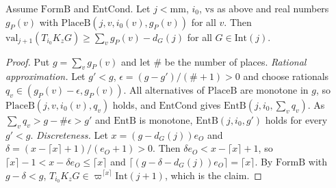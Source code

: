 \begin{lemma}\label{pf:top-shape:formplace}
Assume $\mathrm{FormB}$ and $\mathrm{EntCond}$. Let $j<\mathrm{mm}$, $i_0$, $\mathrm{vs}$ as above and real numbers $g_P(v)$ with
$\mathrm{PlaceB}(j,v,i_0(v),g_P(v))$ for all $v$. Then $\mathrm{val}_{j+1}(T_{i_0}K_zG)\ge\sum_vg_P(v)-d_G(j)$ for all $G\in\mathrm{Int}(j)$.
\end{lemma}

\begin{proof}
Put $g=\sum_vg_P(v)$ and let $\#$ be the number of places. \emph{Rational approximation.} Let $g'<g$,
$\epsilon=(g-g')/(\#+1)>0$ and choose rationals $q_v\in(g_P(v)-\epsilon,g_P(v))$. All alternatives of $\mathrm{PlaceB}$ are
monotone in $g$, so $\mathrm{PlaceB}(j,v,i_0(v),q_v)$ holds, and $\mathrm{EntCond}$ gives $\mathrm{EntB}(j,i_0,\sum_vq_v)$. As
$\sum_vq_v>g-\#\epsilon>g'$ and $\mathrm{EntB}$ is monotone, $\mathrm{EntB}(j,i_0,g')$ holds for every $g'<g$.
\emph{Discreteness.} Let $x=(g-d_G(j))e_O$ and $\delta=(x-\lceil x\rceil+1)/(e_O+1)>0$. Then $\delta e_O<x-\lceil x\rceil+1$, so
$\lceil x\rceil-1<x-\delta e_O\le\lceil x\rceil$ and $\lceil(g-\delta-d_G(j))e_O\rceil=\lceil x\rceil$. By $\mathrm{FormB}$ with
$g-\delta<g$, $T_{i_0}K_zG\in\varpi^{\lceil x\rceil}\mathrm{Int}(j+1)$, which is the claim.
\end{proof}

